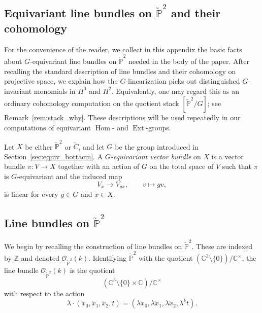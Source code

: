 \documentclass[dvipsnames,11pt]{article}
\theoremstyle{definition}
\newcommand{\cO}{\mathcal{O}}
\newcommand{\Z}{{\mathbb Z}}
\newcommand{\C}{{\mathbb C}}
\renewcommand{\P}{{\mathbb P}}
\def\Ext{\operatorname{Ext}}
\def\Ext{\operatorname{Ext}}
\DeclareMathOperator{\Hom}{Hom}
\begin{document}
\begin{appendices}


\section{Equivariant line bundles on \texorpdfstring{$\widetilde{\mathbb{P}}^2$}{P2-tilde} and their cohomology}
\label{appendix:G_sheaves}

For the convenience of the reader, we collect in this appendix the basic facts about \(G\)-equivariant line bundles on \(\widetilde{\P}^2\) needed in the body of the paper. After recalling the standard description of line bundles and their cohomology on projective space, we explain how the \(G\)-linearization picks out distinguished \(G\)-invariant monomials in \(H^0\) and \(H^2\). Equivalently, one may regard this as an ordinary cohomology computation on the quotient stack
$[\widetilde{\P}^2/G]$; see Remark~\ref{rem:stack_why}. These descriptions will be used repeatedly in our computations of equivariant \(\Hom\)- and \(\Ext\)-groups.


Let \(X\) be either \(\widetilde{\P}^2\) or \(\widetilde C\), and let \(G\) be the group introduced in Section~\ref{sec:equiv_bottacin}. A \emph{\(G\)-equivariant vector bundle} on \(X\) is a vector bundle \(\pi:V\to X\) together with an action of \(G\) on the total space of \(V\) such that \(\pi\) is \(G\)-equivariant and the induced map
\[
V_x \rightarrow V_{gx}, \qquad v \mapsto gv,
\]
is linear for every \(g\in G\) and \(x\in X\).


\subsection{Line bundles on \texorpdfstring{$\widetilde{\P}^2$}{P2-tilde}}

We begin by recalling the construction of line bundles on \(\widetilde{\P}^2\). These are indexed by \(\Z\) and denoted \(\cO_{\widetilde{\P}^2}(k)\). Identifying \(\widetilde{\P}^2\) with the quotient \((\C^3\setminus\{0\})/\C^\times\), the line bundle \(\cO_{\widetilde{\P}^2}(k)\) is the quotient
\[
(\C^3\setminus\{0\}\times \C)/\C^\times
\]
with respect to the action
\[
\lambda\cdot (\widetilde x_0,\widetilde x_1,\widetilde x_2,t)
=
(\lambda \widetilde x_0,\lambda \widetilde x_1,\lambda \widetilde x_2,\lambda^k t).
\]


\end{appendices}
\end{document}
